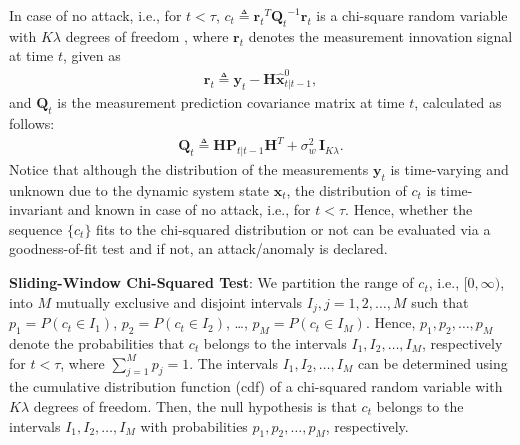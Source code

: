 \documentclass[onecolumn]{IEEEtran}
\begin{document}
In case of no attack, i.e., for $t < \tau$, $c_t \triangleq {\mathbf{r}_t}^T  {\mathbf{Q}_t}^{-1} \mathbf{r}_t$ is a chi-square random variable with $K \lambda$ degrees of freedom \cite{Brumback87}, where $\mathbf{r}_t$ denotes the measurement innovation signal at time $t$, given as
\begin{gather} \label{eq:residual} \nonumber
\mathbf{r}_t \triangleq \mathbf{y}_t - \mathbf{H} \hat{\mathbf{x}}_{t|t-1}^{0},
\end{gather}
and $\mathbf{Q}_t$ is the measurement prediction covariance matrix at time $t$, calculated as follows:
\begin{gather} \label{eq:meas_pred_cov} \nonumber
\mathbf{Q}_t \triangleq \mathbf{H} \mathbf{P}_{t|t-1} \mathbf{H}^T + \sigma_w^2 \, \mathbf{I}_{K \lambda}.
\end{gather}
Notice that although the distribution of the measurements $\mathbf{y}_t$ is time-varying and unknown due to the dynamic system state $\mathbf{x}_t$, the distribution of $c_t$ is time-invariant and known in case of no attack, i.e., for $t < \tau$. Hence, whether the sequence $\{c_t\}$ fits to the chi-squared distribution or not can be evaluated via a goodness-of-fit test and if not, an attack/anomaly is declared.

\vspace{0.2cm}

\textbf{Sliding-Window Chi-Squared Test}: We partition the range of $c_t$, i.e., $[0, \infty)$, into $M$ mutually exclusive and disjoint intervals $I_j, j = 1,2, \dots, M$ such that $p_1 = P(c_t \in I_1)$, $p_2 = P(c_t \in I_2)$, \dots, $p_M = P(c_t \in I_M)$. Hence, $p_1, p_2, \dots, p_M$ denote the probabilities that $c_t$ belongs to the intervals $I_1, I_2, \dots, I_M$, respectively for $t < \tau$, where $\sum_{j=1}^{M} p_j = 1$. The intervals $I_1, I_2, \dots, I_M$ can be determined using the cumulative distribution function (cdf) of a chi-squared random variable with $K \lambda$ degrees of freedom. Then, the null hypothesis is that $c_t$ belongs to the intervals $I_1, I_2, \dots, I_M$ with probabilities $p_1, p_2, \dots, p_M$, respectively.
\end{document}
